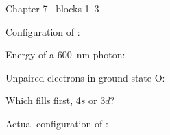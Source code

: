 \documentclass{apchem-worksheet}
\begin{document}
\begin{spiralstrip}{Chapter 7 \textbullet\ blocks 1--3}
  \item Configuration of : 
  \item Energy of a \SI{600}{\nano\meter} photon:
  \item Unpaired electrons in ground-state O: 
  \item Which fills first, 4$s$ or 3$d$? 
  \item Actual configuration of :
\end{spiralstrip}
\end{document}
